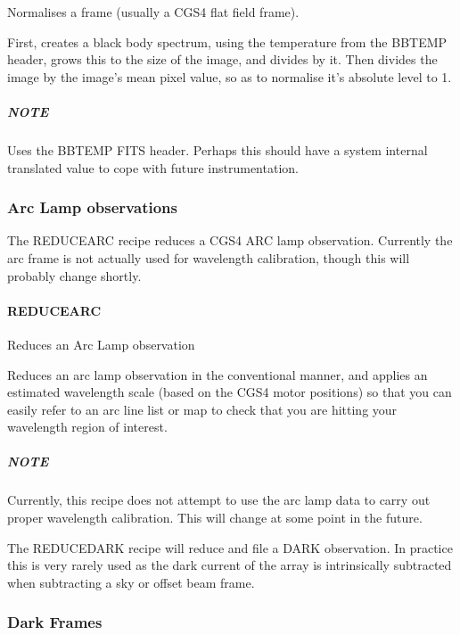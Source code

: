 \documentclass[twoside,11pt]{article}
\renewcommand{\_}{\texttt{\symbol{95}}}
\begin{document}
\mbox{}

Normalises a frame (usually a CGS4 flat field frame).



First, creates a black body spectrum, using the temperature from the
BBTEMP header, grows this to the size of the image, and divides by
it. Then divides the image by the image's mean pixel value, so as to
normalise it's absolute level to 1.

\subparagraph*{NOTE\label{_NORMALISE_FLAT_BY_BB__NOTE}}

Uses the BBTEMP FITS header. Perhaps this should have a system internal
translated value to cope with future instrumentation.


\subsubsection{Arc Lamp observations}

The REDUCE\_ARC recipe reduces a CGS4 ARC lamp observation. Currently
the arc frame is not actually used for wavelength calibration, though
this will probably change shortly.

\paragraph{REDUCE\_ARC\label{REDUCE_ARC}}

Reduces an Arc Lamp observation


\mbox{}

Reduces an arc lamp observation in the conventional manner, and
applies an estimated wavelength scale (based on the CGS4 motor
positions) so that you can easily refer to an arc line list or map to
check that you are hitting your wavelength region of interest.

\subparagraph*{NOTE\label{REDUCE_ARC_NOTE}}

Currently, this recipe does not attempt to use the arc lamp data to
carry out proper wavelength calibration. This will change at some
point in the future.


The REDUCE\_DARK recipe will reduce and file a DARK observation. In
practice this is very rarely used as the dark current of the array is
intrinsically subtracted when subtracting a sky or offset beam frame.

\subsubsection{Dark Frames}
\end{document}
